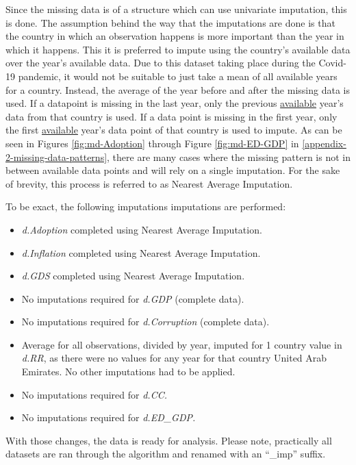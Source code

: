 \documentclass[
]{article}
\begin{document}
Since the missing data is of a structure which can use univariate imputation, this is done. The assumption behind the way that the imputations are done is that the country in which an observation happens is more important than the year in which it happens. This it is preferred to impute using the country's available data over the year's available data. Due to this dataset taking place during the Covid-19 pandemic, it would not be suitable to just take a mean of all available years for a country. Instead, the average of the year before and after the missing data is used. If a datapoint is missing in the last year, only the previous \ul{available} year's data from that country is used. If a data point is missing in the first year, only the first \ul{available} year's data point of that country is used to impute. As can be seen in Figures \ref{fig:md-Adoption} through Figure \ref{fig:md-ED-GDP} in \ref{appendix-2-missing-data-patterns}, there are many cases where the missing pattern is not in between available data points and will rely on a single imputation. For the sake of brevity, this process is referred to as Nearest Average Imputation.

To be exact, the following imputations imputations are performed:

\begin{itemize}
\item
  \emph{d.Adoption} completed using Nearest Average Imputation.
\item
  \emph{d.Inflation} completed using Nearest Average Imputation.
\item
  \emph{d.GDS} completed using Nearest Average Imputation.
\item
  No imputations required for \emph{d.GDP} (complete data).
\item
  No imputations required for \emph{d.Corruption} (complete data).
\item
  Average for all observations, divided by year, imputed for 1 country value in \emph{d.RR}, as there were no values for any year for that country United Arab Emirates. No other imputations had to be applied.
\item
  No imputations required for \emph{d.CC.}
\item
  No imputations required for \emph{d.ED\_GDP.}
\end{itemize}

With those changes, the data is ready for analysis. Please note, practically all datasets are ran through the algorithm and renamed with an ``\_imp'' suffix.
\end{document}
